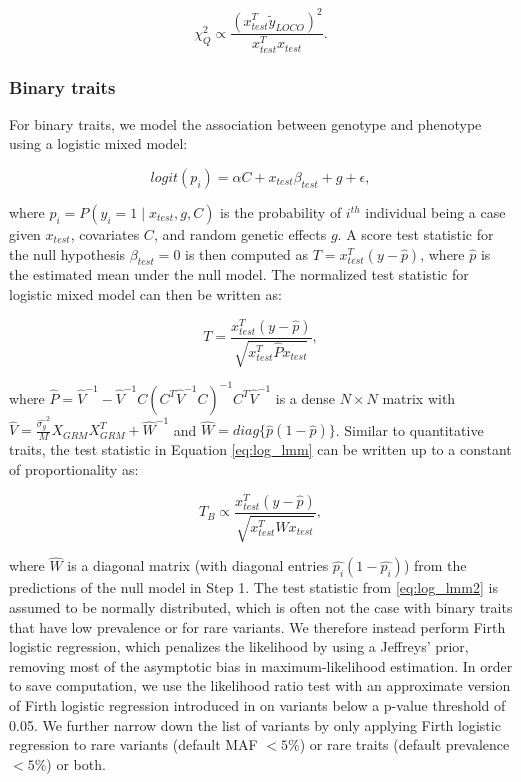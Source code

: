 \begin{equation}
    \chi^2_{Q} \propto \frac{(x_{test}^T \tilde{y}_{LOCO})^2}{x_{test}^T x_{test}}.
    \label{chisq_test_2}
\end{equation}

\subsubsection{Binary traits}
%
For binary traits, we model the association between genotype and phenotype using a logistic mixed model:
%

\begin{equation}
    logit(p_i) = \alpha C + x_{test}\beta_{test} + g + \epsilon, \label{eq:log_lmm}
\end{equation}

where $p_i = P(y_i = 1 \mid x_{test}, g, C)$ is the probability of $i^{th}$ individual being a case given $x_{test}$, covariates $C$, and random genetic effects $g$.
%
A score test statistic for the null hypothesis $\beta_{test} = 0$ is then computed as $T = x_{test}^T(y - \hat{p})$, where $\hat{p}$ is the estimated mean under the null model.
%
The normalized test statistic for logistic mixed model can then be written as: 
%

\begin{equation}
    T = \frac{x_{test}^T(y - \hat{p})}{\sqrt{x_{test}^T\hat{P}x_{test}}},
\label{eq:log_lmm1}
\end{equation}

where $\hat{P} = \hat{V}^{-1} - \hat{V}^{-1} C(C^T\hat{V}^{-1}C)^{-1}C^T\hat{V}^{-1}$ is a dense $N \times N$ matrix with $\hat{V} = \frac{\hat{\sigma_g}^2}{M} X_{GRM}X_{GRM}^T + \hat{W}^{-1}$ and $\hat{W} = diag\{ \hat{p} (1-\hat{p}) \}$.
%
Similar to quantitative traits, the test statistic in Equation \ref{eq:log_lmm} can be written up to a constant of proportionality \cite{zhou2018efficiently} as:
%

\begin{equation}
    T_{B} \propto \frac{x_{test}^T(y - \hat{p})}{\sqrt{x_{test}^T\hat{W}x_{test}}},
\label{eq:log_lmm2}
\end{equation}

where $\hat{W}$ is a diagonal matrix (with diagonal entries $\hat{p_i} (1-\hat{p_i})$) from the predictions of the null model in Step 1.
%
The test statistic from \ref{eq:log_lmm2} is assumed to be normally distributed, which is often not the case with binary traits that have low prevalence or for rare variants.
%
We therefore instead perform Firth logistic regression, which penalizes the likelihood by using a Jeffreys' prior, removing most of the asymptotic bias in maximum-likelihood estimation.
%
In order to save computation, we use the likelihood ratio test with an approximate version of Firth logistic regression introduced in \cite{mbatchou2021computationally} on variants below a p-value threshold of 0.05. 
%
We further narrow down the list of variants by only applying Firth logistic regression to rare variants (default MAF $< 5\%$) or rare traits (default prevalence $< 5\%$) or both.

